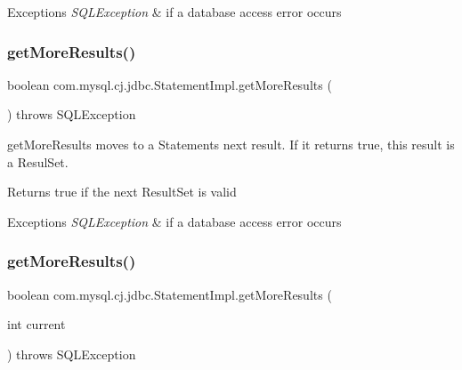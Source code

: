 \begin{DoxyExceptions}{Exceptions}
{\em S\+Q\+L\+Exception} & if a database access error occurs \\
\hline
\end{DoxyExceptions}
\mbox{\label{classcom_1_1mysql_1_1cj_1_1jdbc_1_1_statement_impl_a0791ff241a89529adb0be7da26a0ec62}} 
\subsubsection{\texorpdfstring{get\+More\+Results()}{getMoreResults()}\hspace{0.1cm}{\footnotesize\ttfamily [1/2]}}
{\footnotesize\ttfamily boolean com.\+mysql.\+cj.\+jdbc.\+Statement\+Impl.\+get\+More\+Results (\begin{DoxyParamCaption}{ }\end{DoxyParamCaption}) throws S\+Q\+L\+Exception}

get\+More\+Results moves to a Statement\textquotesingle{}s next result. If it returns true, this result is a Resul\+Set.

\begin{DoxyReturn}{Returns}
true if the next Result\+Set is valid
\end{DoxyReturn}

\begin{DoxyExceptions}{Exceptions}
{\em S\+Q\+L\+Exception} & if a database access error occurs \\
\hline
\end{DoxyExceptions}
\mbox{\label{classcom_1_1mysql_1_1cj_1_1jdbc_1_1_statement_impl_a2cf53265012d4410f8090334c4837e81}} 
\subsubsection{\texorpdfstring{get\+More\+Results()}{getMoreResults()}\hspace{0.1cm}{\footnotesize\ttfamily [2/2]}}
{\footnotesize\ttfamily boolean com.\+mysql.\+cj.\+jdbc.\+Statement\+Impl.\+get\+More\+Results (\begin{DoxyParamCaption}\item[{int}]{current }\end{DoxyParamCaption}) throws S\+Q\+L\+Exception}

